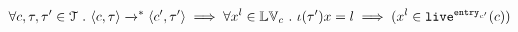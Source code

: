 

\begin{lem}
\label{lem:inv_live}
\[
	\forall c, \mathtt{\tau}, \mathtt{\tau}' \in \mathcal{T} ~.~
	\langle c, \mathtt{\tau} \rangle \xrightarrow{}^* \langle c', \mathtt{\tau}' \rangle
	\implies
	\forall x^l \in \mathbb{LV}_c ~.~ \iota(\mathtt{\tau}') x = l \implies (x^l \in \mathtt{live}^{\mathtt{entry}_{c'}}(c))
\]
\end{lem}

